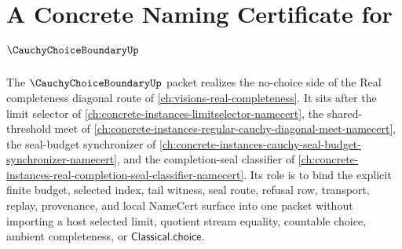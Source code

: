 \chapter{A Concrete Naming Certificate for $\CauchyChoiceBoundaryUp$}
\label{ch:concrete-instances-cauchy-choice-boundary-namecert}

The $\CauchyChoiceBoundaryUp$ packet realizes the no-choice side of the Real completeness diagonal route of \autoref{ch:visions-real-completeness}. It sits after the limit selector of \autoref{ch:concrete-instances-limitselector-namecert}, the shared-threshold meet of \autoref{ch:concrete-instances-regular-cauchy-diagonal-meet-namecert}, the seal-budget synchronizer of \autoref{ch:concrete-instances-cauchy-seal-budget-synchronizer-namecert}, and the completion-seal classifier of \autoref{ch:concrete-instances-real-completion-seal-classifier-namecert}. Its role is to bind the explicit finite budget, selected index, tail witness, seal route, refusal row, transport, replay, provenance, and local NameCert surface into one packet without importing a host selected limit, quotient stream equality, countable choice, ambient completeness, or $\mathsf{Classical.choice}$.



